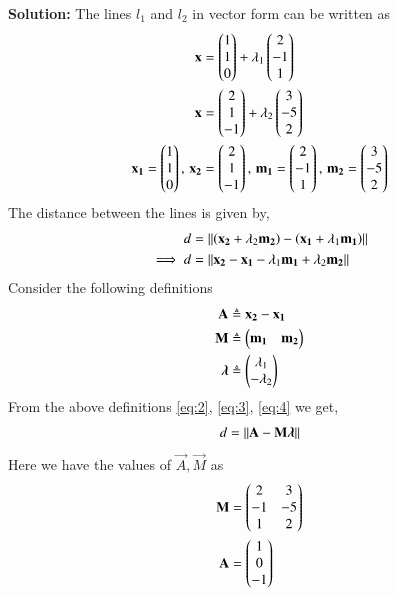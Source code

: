 \documentclass[journal,12pt,twocolumn]{IEEEtran}
\begin{document}
\begin{enumerate}
\textbf{Solution:} The lines $l_1$ and $l_2$ in vector form can be written as
\begin{align}
\mathbf{x} &= \begin{pmatrix}1\\1\\0\end{pmatrix} + \lambda_1\begin{pmatrix}2\\-1\\1\end{pmatrix}\\
\mathbf{x} &= \begin{pmatrix}2\\1\\-1\end{pmatrix} + \lambda_2\begin{pmatrix}3\\-5\\2\end{pmatrix}\\
\mathbf{x_1} = \begin{pmatrix}1\\1\\0\end{pmatrix},\, \mathbf{x_2} &= \begin{pmatrix}2\\1\\-1\end{pmatrix}, \,\mathbf{m_1} = \begin{pmatrix}2\\-1\\1\end{pmatrix}, \, \mathbf{m_2} = \begin{pmatrix}3\\-5\\2\end{pmatrix}
\end{align}
The distance between the lines is given by,
\begin{align}
d &= \left\lVert\left(\mathbf{x_2}+ \lambda_2\mathbf{m_2}\right) - \left(\mathbf{x_1}+ \lambda_1\mathbf{m_1}\right)\right\rVert\\
\implies d &= \left\lVert\mathbf{x_2}-\mathbf{x_1}-\lambda_1\mathbf{m_1}+\lambda_2\mathbf{m_2}\right\rVert \label{eq:1}
\end{align}
Consider the following definitions
\begin{align}
\mathbf{A} &\triangleq \mathbf{x_2} - \mathbf{x_1} \label{eq:2}\\
\mathbf{M} &\triangleq \begin{pmatrix}\mathbf{m_1} & \mathbf{m_2}\end{pmatrix} \label{eq:3}\\
\bm{\lambda} &\triangleq \begin{pmatrix}\lambda_1\\-\lambda_2\end{pmatrix} \label{eq:4}
\end{align}
From the above definitions \eqref{eq:2}, \eqref{eq:3}, \eqref{eq:4} we get,
\begin{align}
d = \left\lVert\mathbf{A}-\mathbf{M}\bm{\lambda}\right\rVert
\end{align}
Here we have the values of $\vec{A}, \vec{M}$ as
\begin{align}
\mathbf{M} &= \begin{pmatrix}2&3\\-1&-5\\1&2\end{pmatrix}\\
\mathbf{A} &= \begin{pmatrix}1\\0\\-1\end{pmatrix}
\end{align}

\end{enumerate}
\end{document}
